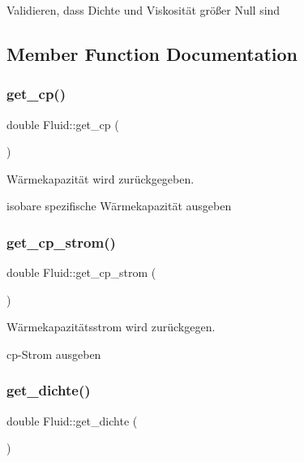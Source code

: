 Validieren, dass Dichte und Viskosität größer Null sind 

\subsection{Member Function Documentation}
\mbox{\label{class_fluid_a86bf10785c4c5822eabf9245f0b39ae0}} 
\subsubsection{\texorpdfstring{get\+\_\+cp()}{get\_cp()}}
{\footnotesize\ttfamily double Fluid\+::get\+\_\+cp (\begin{DoxyParamCaption}{ }\end{DoxyParamCaption})}



Wärmekapazität wird zurückgegeben. 

isobare spezifische Wärmekapazität ausgeben \mbox{\label{class_fluid_a5c589565d1bde26bc83125e3e8939796}} 
\subsubsection{\texorpdfstring{get\+\_\+cp\+\_\+strom()}{get\_cp\_strom()}}
{\footnotesize\ttfamily double Fluid\+::get\+\_\+cp\+\_\+strom (\begin{DoxyParamCaption}{ }\end{DoxyParamCaption})}



Wärmekapazitätsstrom wird zurückgegen. 

cp-\/\+Strom ausgeben \mbox{\label{class_fluid_acb9e3346c0871ad5fefc9d11dcfc3283}} 
\subsubsection{\texorpdfstring{get\+\_\+dichte()}{get\_dichte()}}
{\footnotesize\ttfamily double Fluid\+::get\+\_\+dichte (\begin{DoxyParamCaption}{ }\end{DoxyParamCaption})}



